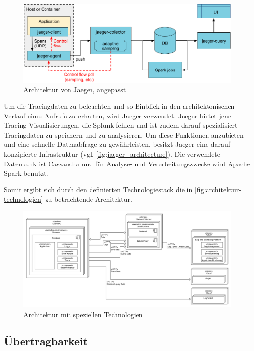 \begin{figure}
\centering
\includegraphics[width=\linewidth]{img/04_erstellung-poc/jaeger_architecture-v1_edited.png}
\caption{Architektur von Jaeger, angepasst \cite{JaegerArchitecture}}
\label{fig:jaeger_architecture}
\end{figure}
	
	Um die Tracingdaten zu beleuchten und so Einblick in den architektonischen Verlauf eines Aufrufs zu erhalten, wird Jaeger verwendet. Jaeger bietet jene Tracing-Visualisierungen, die Splunk fehlen und ist zudem darauf spezialisiert Tracingdaten zu speichern und zu analysieren. Um diese Funktionen anzubieten und eine schnelle Datenabfrage zu gewährleisten, besitzt Jaeger eine darauf konzipierte Infrastruktur (vgl. \autoref{fig:jaeger_architecture}). Die verwendete Datenbank ist Cassandra und für Analyse- und Verarbeitungszwecke wird Apache Spark benutzt.
	
	Somit ergibt sich durch den definierten Technologiestack die in \autoref{fig:architektur-technologien} zu betrachtende Architektur.
	
\begin{figure}[H]
	\centering
	\includegraphics[width=0.75\linewidth]{img/04_erstellung-poc/konzept-technologien.png}
	\caption{Architektur mit speziellen Technologien}
	\label{fig:architektur-technologien}
\end{figure}

	\subsection{Übertragbarkeit}
	
